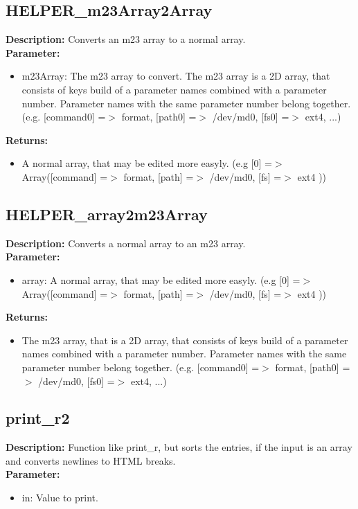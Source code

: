 \subsection{HELPER\_m23Array2Array}
\textbf{Description:} Converts an m23 array to a normal array.\\
\textbf{Parameter:}
\begin{itemize}
\item m23Array: The m23 array to convert. The m23 array is a 2D array, that consists of keys build of a parameter names combined with a parameter number. Parameter names with the same parameter number belong together. (e.g. [command0] =$>$ format, [path0] =$>$ /dev/md0, [fs0] =$>$ ext4, ...)
\end{itemize}
\textbf{Returns:}
\begin{itemize}
\item A normal array, that may be edited more easyly. (e.g [0] =$>$ Array([command] =$>$ format, [path] =$>$ /dev/md0, [fs] =$>$ ext4 ))
\end{itemize}

\subsection{HELPER\_array2m23Array}
\textbf{Description:} Converts a normal array to an m23 array.\\
\textbf{Parameter:}
\begin{itemize}
\item array: A normal array, that may be edited more easyly. (e.g [0] =$>$ Array([command] =$>$ format, [path] =$>$ /dev/md0, [fs] =$>$ ext4 ))
\end{itemize}
\textbf{Returns:}
\begin{itemize}
\item The m23 array, that is a 2D array, that consists of keys build of a parameter names combined with a parameter number. Parameter names with the same parameter number belong together. (e.g. [command0] =$>$ format, [path0] =$>$ /dev/md0, [fs0] =$>$ ext4, ...)
\end{itemize}

\subsection{print\_r2}
\textbf{Description:} Function like print\_r, but sorts the entries, if the input is an array and converts newlines to HTML breaks.\\
\textbf{Parameter:}
\begin{itemize}
\item in: Value to print.
\end{itemize}

